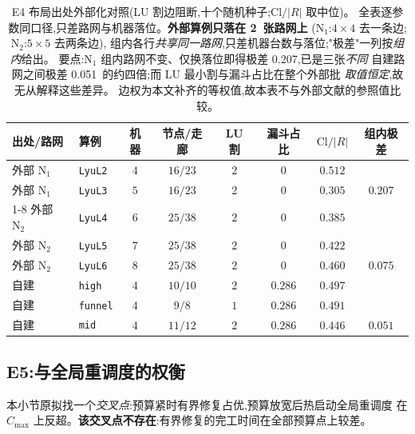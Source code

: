 \documentclass[manuscript,screen,review]{acmart}
\newcommand{\NPubNets}{2}
\newcommand{\PubCloSpread}{0.207}
\newcommand{\PubCloSpreadBig}{0.075}
\newcommand{\SelfCloSpread}{0.051}
\begin{document}
\begin{table}[t]
\centering
\caption{E4 布局出处外部化对照(LU 割边阻断,十个随机种子;\(\mathrm{Cl}/|R|\) 取中位)。
全表逐参数同口径,只差路网与机器落位。\textbf{外部算例只落在 \NPubNets\ 张路网上}
(\(\mathrm{N}_1\):\(4\times 4\) 去一条边;\(\mathrm{N}_2\):\(5\times 5\) 去两条边),
组内各行\emph{共享同一路网},只差机器台数与落位;"极差"一列按\emph{组内}给出。
要点:\(\mathrm{N}_1\) 组内路网不变、仅换落位即得极差 \PubCloSpread,已是三张\emph{不同}
自建路网之间极差 \SelfCloSpread\ 的约四倍;而 LU 最小割与漏斗占比在整个外部批
\emph{取值恒定},故无从解释这些差异。
边权为本文补齐的等权值,故本表不与外部文献的参照值比较。}
\label{tab:e4pub}
\small
\begin{tabular}{@{}llcccccc@{}}
\toprule
出处/路网 & 算例 & 机器 & 节点/走廊 & LU 割 & 漏斗占比 & \(\mathrm{Cl}/|R|\)
 & 组内极差 \\
\midrule
外部 \(\mathrm{N}_1\) & \texttt{LyuL2} & \(4\) & \(16/23\) & \(2\) & \(0\) & \(0.512\) & \\
外部 \(\mathrm{N}_1\) & \texttt{LyuL3} & \(5\) & \(16/23\) & \(2\) & \(0\) & \(0.305\)
  & \(\PubCloSpread\) \\
\cmidrule{1-8}
外部 \(\mathrm{N}_2\) & \texttt{LyuL4} & \(6\) & \(25/38\) & \(2\) & \(0\) & \(0.385\) & \\
外部 \(\mathrm{N}_2\) & \texttt{LyuL5} & \(7\) & \(25/38\) & \(2\) & \(0\) & \(0.422\) & \\
外部 \(\mathrm{N}_2\) & \texttt{LyuL6} & \(8\) & \(25/38\) & \(2\) & \(0\) & \(0.460\)
  & \(\PubCloSpreadBig\) \\
\midrule
自建 & \texttt{high} & \(4\) & \(10/10\) & \(2\) & \(0.286\) & \(0.497\) & \\
自建 & \texttt{funnel} & \(4\) & \(9/8\) & \(1\) & \(0.286\) & \(0.491\) & \\
自建 & \texttt{mid} & \(4\) & \(11/12\) & \(2\) & \(0.286\) & \(0.446\)
  & \(\SelfCloSpread\) \\
\bottomrule
\end{tabular}
\end{table}

\subsection{E5:与全局重调度的权衡}
\label{sec:e5}

本小节原拟找一个\emph{交叉点}:预算紧时有界修复占优,预算放宽后热启动全局重调度
在 \(C_{\max}\) 上反超。\textbf{该交叉点不存在}:有界修复的完工时间在全部预算点上较差。
\end{document}
